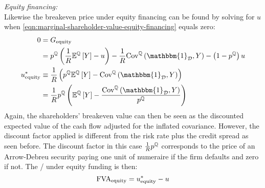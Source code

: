 \documentclass[../main.tex]{subfiles}
\begin{document}
            \textit{Equity financing:} \\
            Likewise the breakeven price under equity financing can be found by solving for $u$
            when \cref{eqn:marginal-shareholder-value-equity-financing} equals zero:
                \begin{align}
                    0 &= G_{\text{equity}} 
                        \nonumber \\
                    &=
                        p^{\mathbb{Q}} \left(
                            \discountfactor
                            \mathbb{E}^{\mathbb{Q}}\left[Y\right]
                            - u
                        \right)
                        -
                        \discountfactor
                        \text{Cov}^{\mathbb{Q}}\left(\mathbbm{1}_{\mathcal{D}}, Y\right) 
                        - 
                        \left(
                            1
                            -
                            p^{\mathbb{Q}}
                        \right)
                        u 
                        \nonumber \\
                    u_{\text{equity}}^{\ast}
                    &\equiv
                        \discountfactor
                        \left(
                            p^{\mathbb{Q}}
                            \mathbb{E}^{\mathbb{Q}}\left[Y\right]
                            -
                            \text{Cov}^{\mathbb{Q}}\left(\mathbbm{1}_{\mathcal{D}}, Y\right) 
                        \right)
                        \nonumber \\
                    &= 
                        \discountfactor
                        p^{\mathbb{Q}}
                        \left(
                            \mathbb{E}^{\mathbb{Q}}\left[Y\right]
                            -
                            \frac{
                                \text{Cov}^{\mathbb{Q}}\left(\mathbbm{1}_{\mathcal{D}}, Y\right)
                            }{
                                p^{\mathbb{Q}}  
                            }  
                        \right)
                    \label{eqn:shareholders-breakeven-equity-financing}
                \end{align}
            Again, the shareholders' breakeven value can then be seen as the discounted expected value of the cash flow
            adjusted for the inflated covariance.
            However, the discount factor applied is different from the risk rate plus the credit spread as seen before.
            The discount factor in this case $\frac{1}{R} p^{\mathbb{Q}}$ corresponds to 
            the price of an Arrow-Debreu security paying one unit of numeraire if the firm defaults and zero if not.
            The \FVA/ under equity funding is then:
                \begin{equation}
                    \FVA/_{\text{equity}} 
                        = u^{\ast}_{\text{equity}} - u
                    \label{eqn:fva-equity-financing}
                \end{equation}
\end{document}
